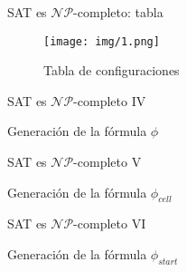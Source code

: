 \documentclass[10pt, mathserif, profesionalfont]{beamer}
\begin{document}
\begin{frame}{SAT es $\mathcal{NP}$-completo: tabla}

  \begin{figure}[f]
  \texttt{[image: img/1.png]}
  \caption{Tabla de configuraciones}
  \end{figure}

\end{frame}

\begin{frame}{SAT es $\mathcal{NP}$-completo IV}

\begin{block}{Generación de la fórmula $\phi$}
\end{block}

\end{frame}


\begin{frame}{SAT es $\mathcal{NP}$-completo V}

\begin{block}{Generación de la fórmula $\phi_{cell}$}
\end{block}

\end{frame}


\begin{frame}{SAT es $\mathcal{NP}$-completo VI}

\begin{block}{Generación de la fórmula $\phi_{start}$}
\end{block}

\end{frame}
\end{document}
